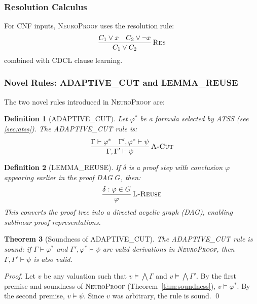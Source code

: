 \documentclass[conference]{IEEEtran}
\newtheorem{theorem}{Theorem}[section]
\newtheorem{definition}[theorem]{Definition}
\newcommand{\entails}{\vDash}
\newcommand{\proves}{\vdash}
\newcommand{\dlor}{\mathbin{\vee}}
\newcommand{\dlnot}{\neg}
\newcommand{\NP}{\textsc{NeuroProof}}
\newcommand{\ATSS}{\textsc{ATSS}}
\newcommand{\infrule}[3]{
  \dfrac{\displaystyle #2}{\displaystyle #3}\,\textsc{#1}
}
\begin{document}
\subsubsection{Resolution Calculus}

For CNF inputs, \NP{} uses the resolution rule:
\begin{equation}
  \infrule{Res}
    {C_1 \dlor x \quad C_2 \dlor \dlnot x}
    {C_1 \dlor C_2}
\end{equation}
combined with CDCL clause learning.

\subsubsection{Novel Rules: ADAPTIVE\_CUT and LEMMA\_REUSE}

The two novel rules introduced in \NP{} are:

\begin{definition}[ADAPTIVE\_CUT]
  \label{def:adaptive-cut}
  Let $\varphi^*$ be a formula selected by \ATSS{} (see \cref{sec:atss}).
  The \emph{ADAPTIVE\_CUT} rule is:
  \begin{equation}
    \infrule{A-Cut}
      {\Gamma \proves \varphi^* \quad \Gamma', \varphi^* \proves \psi}
      {\Gamma, \Gamma' \proves \psi}
  \end{equation}
\end{definition}

\begin{definition}[LEMMA\_REUSE]
  If $\delta$ is a proof step with conclusion $\varphi$ appearing earlier in
  the proof DAG $G$, then:
  \begin{equation}
    \infrule{L-Reuse}
      {\delta : \varphi \in G}
      {\varphi}
  \end{equation}
  This converts the proof tree into a directed acyclic graph (DAG), enabling
  sublinear proof representations.
\end{definition}

\begin{theorem}[Soundness of ADAPTIVE\_CUT]
  \label{thm:adaptive-cut-sound}
  The \textup{ADAPTIVE\_CUT} rule is sound: if $\Gamma \proves \varphi^*$ and
  $\Gamma', \varphi^* \proves \psi$ are valid derivations in \NP{}, then
  $\Gamma, \Gamma' \proves \psi$ is also valid.
\end{theorem}
\begin{proof}
  Let $v$ be any valuation such that $v \entails \bigwedge \Gamma$ and
  $v \entails \bigwedge \Gamma'$.  By the first premise and soundness of \NP{}
  (Theorem~\ref{thm:soundness}), $v \entails \varphi^*$.  By the second
  premise, $v \entails \psi$.  Since $v$ was arbitrary, the rule is sound.
  \qed
\end{proof}
\end{document}
